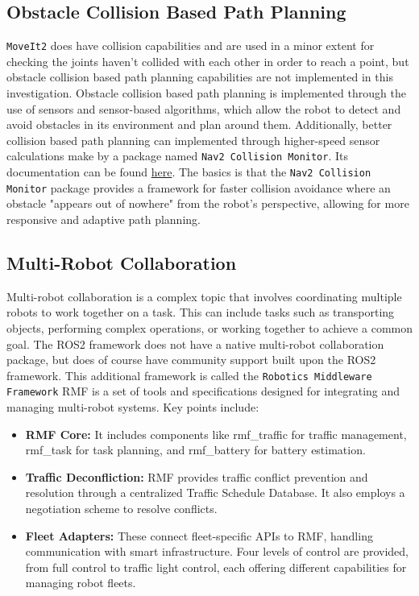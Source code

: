\documentclass[10pt,a4paper,english]{article}
\begin{document}
\subsection{Obstacle Collision Based Path Planning}
\texttt{MoveIt2} does have collision capabilities and are used in a minor extent for checking the joints haven't collided with each other in order to reach a point, but obstacle collision based path planning capabilities are not implemented in this investigation. Obstacle collision based path planning is implemented through the use of sensors and sensor-based algorithms, which allow the robot to detect and avoid obstacles in its environment and plan around them. Additionally, better collision based path planning can implemented through higher-speed sensor calculations make by a package named \texttt{Nav2 Collision Monitor}. Its documentation can be found \href{https://index.ros.org/p/nav2_collision_monitor/#kilted}{here}. The basics is that the \texttt{Nav2 Collision Monitor} package provides a framework for faster collision avoidance where an obstacle "appears out of nowhere" from the robot's perspective, allowing for more responsive and adaptive path planning.

\subsection{Multi-Robot Collaboration}
Multi-robot collaboration is a complex topic that involves coordinating multiple robots to work together on a task. This can include tasks such as transporting objects, performing complex operations, or working together to achieve a common goal. The ROS2 framework does not have a native multi-robot collaboration package, but does of course have community support built upon the ROS2 framework. This additional framework is called the \texttt{Robotics Middleware Framework} 
RMF is a set of tools and specifications designed for integrating and managing multi-robot systems. Key points include:
\begin{itemize}
  \item \textbf{RMF Core:} It includes components like rmf\_traffic for traffic management, rmf\_task for task planning, and rmf\_battery for battery estimation.
  \item \textbf{Traffic Deconfliction:} RMF provides traffic conflict prevention and resolution through a centralized Traffic Schedule Database. It also employs a negotiation scheme to resolve conflicts.
  \item \textbf{Fleet Adapters:} These connect fleet-specific APIs to RMF, handling communication with smart infrastructure. Four levels of control are provided, from full control to traffic light control, each offering different capabilities for managing robot fleets.
\end{itemize}
\end{document}
